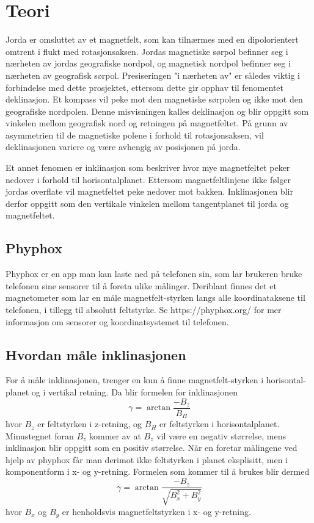 \section{Teori}
Jorda er omsluttet av et magnetfelt, som kan tilnærmes med en 
dipolorientert omtrent i flukt med rotasjonsaksen. Jordas magnetiske sørpol 
befinner seg i nærheten av jordas geografiske nordpol, og magnetisk nordpol 
befinner seg i nærheten av geografisk sørpol. Presiseringen "i nærheten av" 
er således viktig i forbindelse med dette prosjektet, ettersom dette gir 
opphav til fenomentet deklinasjon. Et kompass vil peke mot den magnetiske sørpolen og ikke mot den geografiske nordpolen.
Denne misvisningen kalles deklinasjon og blir oppgitt som vinkelen mellom 
geografisk nord og retningen på magnetfeltet. På grunn av asymmetrien til 
de magnetiske polene i forhold til rotasjonsaksen, vil deklinasjonen 
variere og være avhengig av posisjonen på jorda. \cite{World_magnetic_model}

Et annet fenomen er inklinasjon som beskriver hvor mye magnetfeltet peker 
nedover i forhold til horisontalplanet. Ettersom magnetfeltlinjene ikke følger jordas overflate vil 
magnetfeltet peke nedover mot bakken. Inklinasjonen 
blir derfor oppgitt som den vertikale vinkelen mellom tangentplanet til jorda og
magnetfeltet.

\subsection{Phyphox}
Phyphox er en app man kan laste ned på telefonen sin, som lar brukeren 
bruke telefonen sine sensorer til å foreta ulike målinger. Deriblant finnes 
det et magnetometer som lar en måle magnetfelt-styrken langs alle 
koordinataksene til telefonen, i tillegg til absolutt feltstyrke. 
Se https://phyphox.org/ \cite{phyphox} for mer informasjon om sensorer og koordinatsystemet til telefonen.

\subsection{Hvordan måle inklinasjonen}
For å måle inklinasjonen, trenger en kun å finne magnetfelt-styrken i horisontal-
planet og i vertikal retning. Da blir formelen for inklinasjonen 
\begin{equation}
    \gamma = \arctan \frac{-B_z}{B_H}
\end{equation}
hvor $B_z$ er feltstyrken i z-retning, og $B_H$ er feltstyrken i horisontalplanet. 
Minustegnet foran $B_z$ kommer av at $B_z$ vil være en negativ størrelse, mens inklinasjon blir oppgitt som en positiv størrelse. Når en foretar målingene ved hjelp av 
phyphox får man derimot ikke feltstyrken i planet eksplisitt, men i komponentform i 
x- og y-retning. Formelen som kommer til å brukes blir dermed
\begin{equation}
    \gamma = \arctan{ \frac{-B_z}{\sqrt{B_x^2 + B_y^2}} }
\end{equation}
hvor $B_x$ og $B_y$ er henholdsvis magnetfeltstyrken i x- og y-retning.

